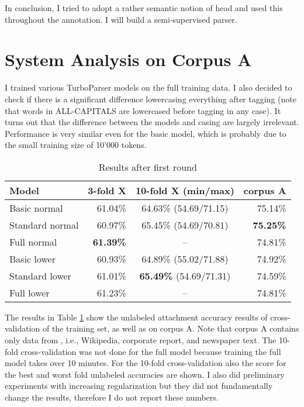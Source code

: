 \documentclass[11pt,letterpaper, covington]{article}
\begin{document}
In conclusion, I tried to adopt a rather semantic notion of head and used this throughout the annotation. I will build a semi-supervised parser.

\section{System Analysis on Corpus A}

I trained various TurboParser models on the full training data. I also decided to check if there is a significant difference lowercasing everything  after tagging (note that words in ALL-CAPITALS are lowercased before tagging in any case). It turns out that the difference between the models and casing are largely irrelevant. Performance is very similar even for the basic model, which is probably due to the small training size of 10'000 tokens.

\begin{table}
\center
  \begin{tabular}{ | l || r | c | r | }
    \hline
   \textbf{Model} & \textbf{3-fold X} & \textbf{10-fold X (min/max)} & \textbf{corpus A}  \\ \hline
    Basic normal & 61.04\% & 64.63\% (54.69/71.15) & 75.14\% \\
    Standard normal & 60.97\% & 65.45\% (54.69/70.81) & \textbf{75.25\%} \\ 
    Full normal & \textbf{61.39\%} & -- & 74.81\% \\ \hline
    Basic lower & 60.93\% & 64.89\% (55.02/71.88) & 74.92\% \\
    Standard lower & 61.01\% & \textbf{65.49\%} (54.69/71.31) & 74.59\% \\
    Full lower & 61.23\% & -- & 74.81\%  \\ \hline
  \end{tabular}
\caption{Results after first round}
\label{tab:dec}
\end{table}

The results in Table \ref{tab:dec} show the unlabeled attachment accuracy results of cross-validation of the training set, as well as on corpus A. Note that corpus A contains only data from \cite{AH14}, i.e., Wikipedia, corporate report, and newspaper text. The 10-fold cross-validation was not done for the full model because training the full model takes over 10 minutes. For the 10-fold cross-validation also the score for the best and worst fold unlabeled accuracies are shown. I also did preliminary experiments with increasing regularization but they did not fundamentally change the results, therefore I do not report these numbers.
\end{document}
